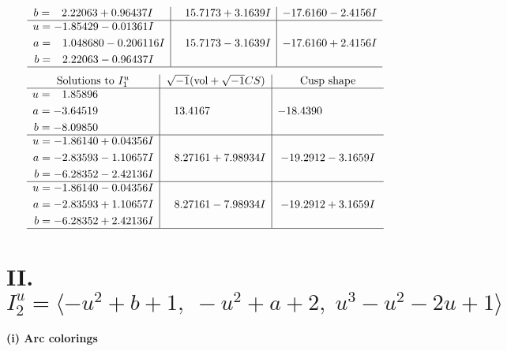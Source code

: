 \documentclass[1p]{elsarticle_modified}
\theoremstyle{definition}
\newcommand{\I}{\sqrt{-1}}
\begin{document}
$$\begin{array}{c|c|c}
\begin{aligned}
b &= \phantom{-}2.22063 + 0.96437 I\end{aligned}
 & \phantom{-}15.7173 + 3.1639 I & -17.6160 - 2.4156 I \\ \hline\begin{aligned}
u &= -1.85429 - 0.01361 I \\
a &= \phantom{-}1.048680 - 0.206116 I \\
b &= \phantom{-}2.22063 - 0.96437 I\end{aligned}
 & \phantom{-}15.7173 - 3.1639 I & -17.6160 + 2.4156 I\\
 \hline 
 \end{array}$$\newpage$$\begin{array}{c|c|c}  
\text{Solutions to }I^u_{1}& \I (\text{vol} + \sqrt{-1}CS) & \text{Cusp shape}\\
 \hline 
\begin{aligned}
u &= \phantom{-}1.85896\phantom{ +0.000000I} \\
a &= -3.64519\phantom{ +0.000000I} \\
b &= -8.09850\phantom{ +0.000000I}\end{aligned}
 & \phantom{-}13.4167\phantom{ +0.000000I} & -18.4390\phantom{ +0.000000I} \\ \hline\begin{aligned}
u &= -1.86140 + 0.04356 I \\
a &= -2.83593 - 1.10657 I \\
b &= -6.28352 - 2.42136 I\end{aligned}
 & \phantom{-}8.27161 + 7.98934 I & -19.2912 - 3.1659 I \\ \hline\begin{aligned}
u &= -1.86140 - 0.04356 I \\
a &= -2.83593 + 1.10657 I \\
b &= -6.28352 + 2.42136 I\end{aligned}
 & \phantom{-}8.27161 - 7.98934 I & -19.2912 + 3.1659 I\\
 \hline 
 \end{array}$$\newpage\newpage\renewcommand{\arraystretch}{1}
\centering \section*{II. $I^u_{2}= \langle - u^2+b+1,\;- u^2+a+2,\;u^3- u^2-2 u+1 \rangle$}
\flushleft \textbf{(i) Arc colorings}\\
\end{document}
